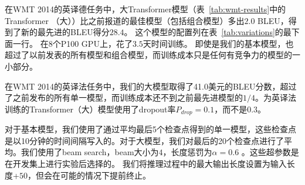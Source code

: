 
在WMT 2014的英译德任务中，大Transformer模型（表~\ref{tab:wmt-results}中的Transformer （大））比之前报道的最佳模型（包括组合模型）多出$2.0$ BLEU，得到了新的最先进的BLEU得分$28.4$。 这个模型的配置列在表~\ref{tab:variations}的最下面一行。 在$8$个P100 GPU上，花了$3.5$天时间训练。 即使是我们的基本模型，也超过了以前发表的所有模型和组合模型，而训练成本只是任何有竞争力的模型的一小部分。


在WMT 2014的英译法任务中，我们的大模型取得了41.0美元的BLEU分数，超过了之前发布的所有单一模型，而训练成本还不到之前最先进模型的$1/4$。为英译法训练的Transformer（大）模型使用了dropout率$P_{drop}=0.1$，而不是$0.3$。


对于基本模型，我们使用了通过平均最后5个检查点得到的单一模型，这些检查点是以10分钟的时间间隔写入的。对于大模型，我们对最后的20个检查点进行了平均。我们使用了beam search，beam大小为$4$，长度惩罚为$\alpha=0.6$ \citep{wu2016google}。这些超参数是在开发集上进行实验后选择的。 我们将推理过程中的最大输出长度设置为输入长度+$50$，但会在可能的情况下提前终止\citep{wu2016google}。

